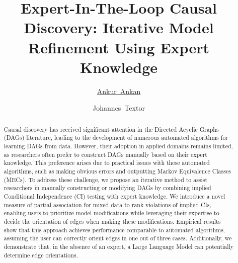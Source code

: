 \documentclass{uai2025} %
\title{Expert-In-The-Loop Causal Discovery: Iterative Model Refinement Using Expert Knowledge}
\author[1]{\href{mailto:<ankur.ankan@ru.nl>?Subject=Your UAI 2025 paper}{Ankur~Ankan}{}}
\author[1]{Johannes~Textor}
\affil[1]{%
    Institute for Computing and Information Sciences\\
    Radboud University\\
    Nijmegen, The Netherlands
}
\begin{document}
\maketitle

\begin{abstract}

Causal discovery has received significant attention in the Directed Acyclic
Graphs (DAGs) literature, leading to the development of numerous automated
algorithms for learning DAGs from data. However, their adoption in applied
domains remains limited, as researchers often prefer to construct DAGs manually
based on their expert knowledge. This preference arises due to practical issues
with these automated algorithms, such as making obvious errors and outputting
Markov Equivalence Classes (MECs). To address these challenge, we propose an
iterative method to assist researchers in manually constructing or modifying
DAGs by combining implied Conditional Independence (CI) testing with expert
knowledge. We introduce a novel measure of partial association for mixed data
to rank violations of implied CIs, enabling users to prioritize model
modifications while leveraging their expertise to decide the orientation of
edges when making these modifications. Empirical results show that this
approach achieves performance comparable to automated algorithms, assuming the
user can correctly orient edges in one out of three cases. Additionally, we
demonstrate that, in the absence of an expert, a Large Language Model can
potentially determine edge orientations.

\end{abstract}
\end{document}
